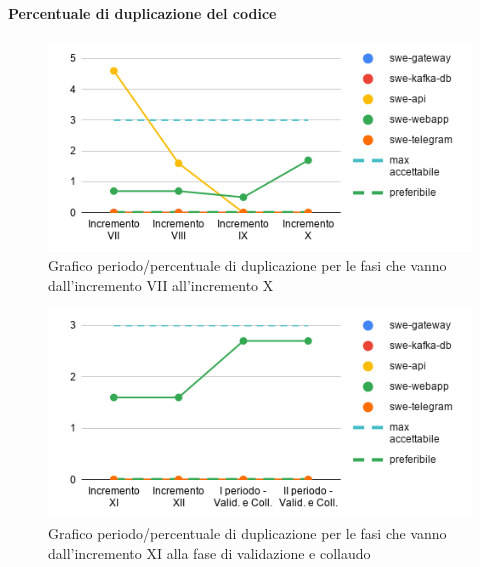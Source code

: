 \paragraph{Percentuale di duplicazione del codice}
	\begin{figure}[H]
			\centering
			\includegraphics[width=0.8\linewidth]{./res/images/QM-PROD-15-DUPC.png}
			\caption{Grafico periodo/percentuale di duplicazione per le fasi che vanno dall'incremento VII all'incremento X}
			\label{fig:Grafico periodo/percentuale di duplicazione per le fasi che vanno dall'incremento VII all'incremento X}
	\end{figure}
	\begin{figure}[H]
			\centering
			\includegraphics[width=0.8\linewidth]{./res/images/QM-PROD-15-DUPC_1.png}
			\caption{Grafico periodo/percentuale di duplicazione per le fasi che vanno dall'incremento XI alla fase di validazione e collaudo}
			\label{fig:Grafico periodo/percentuale di duplicazione per le fasi che vanno dall'incremento XI alla fase di validazione e collaudo}
	\end{figure}

